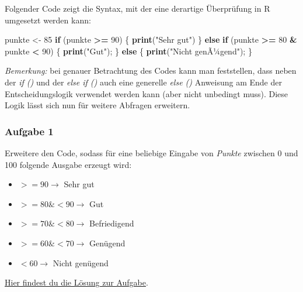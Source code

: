 \documentclass[]{article}
\newenvironment{Shaded}{\begin{snugshade}}{\end{snugshade}}
\newcommand{\KeywordTok}[1]{\textcolor[rgb]{0.13,0.29,0.53}{\textbf{#1}}}
\newcommand{\DecValTok}[1]{\textcolor[rgb]{0.00,0.00,0.81}{#1}}
\newcommand{\StringTok}[1]{\textcolor[rgb]{0.31,0.60,0.02}{#1}}
\newcommand{\ControlFlowTok}[1]{\textcolor[rgb]{0.13,0.29,0.53}{\textbf{#1}}}
\newcommand{\OperatorTok}[1]{\textcolor[rgb]{0.81,0.36,0.00}{\textbf{#1}}}
\newcommand{\NormalTok}[1]{#1}
\providecommand{\tightlist}{%
  \setlength{\itemsep}{0pt}\setlength{\parskip}{0pt}}
\begin{document}
Folgender Code zeigt die Syntax, mit der eine derartige Überprüfung in R
umgesetzt werden kann:

\begin{Shaded}
\begin{Highlighting}[]
\NormalTok{  punkte <-}\StringTok{ }\DecValTok{85}
  \ControlFlowTok{if}\NormalTok{ (punkte }\OperatorTok{>=}\StringTok{ }\DecValTok{90}\NormalTok{) \{}
    \KeywordTok{print}\NormalTok{(}\StringTok{"Sehr gut"}\NormalTok{)}
\NormalTok{    \} }\ControlFlowTok{else} \ControlFlowTok{if}\NormalTok{ (punkte }\OperatorTok{>=}\StringTok{ }\DecValTok{80} \OperatorTok{&}\StringTok{ }\NormalTok{punkte }\OperatorTok{<}\StringTok{ }\DecValTok{90}\NormalTok{) \{}
    \KeywordTok{print}\NormalTok{(}\StringTok{"Gut"}\NormalTok{);    }
\NormalTok{    \} }\ControlFlowTok{else}\NormalTok{ \{}
      \KeywordTok{print}\NormalTok{(}\StringTok{"Nicht genÃ¼gend"}\NormalTok{);    }
\NormalTok{  \}}
\end{Highlighting}
\end{Shaded}

\emph{Bemerkung:} bei genauer Betrachtung des Codes kann man
feststellen, dass neben der \emph{if ()} und der \emph{else if ()} auch
eine generelle \emph{else ()} Anweisung am Ende der Entscheidungslogik
verwendet werden kann (aber nicht unbedingt muss). Diese Logik lässt
sich nun für weitere Abfragen erweitern.

\subsubsection*{Aufgabe 1}\label{aufgabe-1-2}

Erweitere den Code, sodass für eine beliebige Eingabe von \emph{Punkte}
zwischen 0 und 100 folgende Ausgabe erzeugt wird:

\begin{itemize}
\tightlist
\item
  \(>= 90 \rightarrow\) Sehr gut
\item
  \(>= 80 \& < 90 \rightarrow\) Gut
\item
  \(>= 70 \& < 80 \rightarrow\) Befriedigend
\item
  \(>= 60 \& < 70 \rightarrow\) Genügend
\item
  \(< 60 \rightarrow\) Nicht genügend
\end{itemize}

\protect\hyperlink{aufgabe-1-lsg}{Hier findest du die Lösung zur
Aufgabe}.
\end{document}
